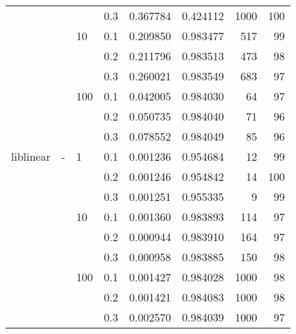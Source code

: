 \begin{table}[H]
\begin{tabular}{llllrrrr}
          &   &     & 0.3 &  0.367784 &  0.424112 &    1000 &   100 \\
          &   & 10  & 0.1 &  0.209850 &  0.983477 &     517 &    99 \\
          &   &     & 0.2 &  0.211796 &  0.983513 &     473 &    98 \\
          &   &     & 0.3 &  0.260021 &  0.983549 &     683 &    97 \\
          &   & 100 & 0.1 &  0.042005 &  0.984030 &      64 &    97 \\
          &   &     & 0.2 &  0.050735 &  0.984040 &      71 &    96 \\
          &   &     & 0.3 &  0.078552 &  0.984049 &      85 &    96 \\
liblinear & - & 1   & 0.1 &  0.001236 &  0.954684 &      12 &    99 \\
          &   &     & 0.2 &  0.001246 &  0.954842 &      14 &   100 \\
          &   &     & 0.3 &  0.001251 &  0.955335 &       9 &    99 \\
          &   & 10  & 0.1 &  0.001360 &  0.983893 &     114 &    97 \\
          &   &     & 0.2 &  0.000944 &  0.983910 &     164 &    97 \\
          &   &     & 0.3 &  0.000958 &  0.983885 &     150 &    98 \\
          &   & 100 & 0.1 &  0.001427 &  0.984028 &    1000 &    98 \\
          &   &     & 0.2 &  0.001421 &  0.984083 &    1000 &    98 \\
          &   &     & 0.3 &  0.002570 &  0.984039 &    1000 &    97 \\
\bottomrule
\end{tabular}
\end{table}
